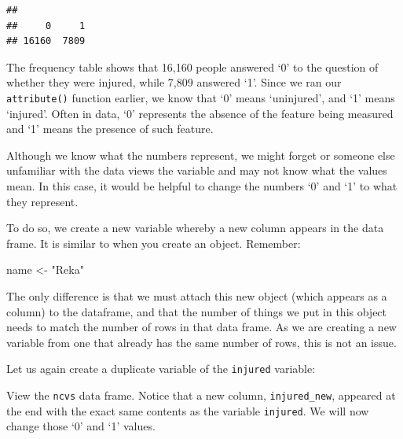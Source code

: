 \documentclass[
]{book}
\newenvironment{Shaded}{\begin{snugshade}}{\end{snugshade}}
\newcommand{\CommentTok}[1]{\textcolor[rgb]{0.56,0.35,0.01}{\textit{#1}}}
\newcommand{\NormalTok}[1]{#1}
\newcommand{\OtherTok}[1]{\textcolor[rgb]{0.56,0.35,0.01}{#1}}
\newcommand{\SpecialCharTok}[1]{\textcolor[rgb]{0.00,0.00,0.00}{#1}}
\newcommand{\StringTok}[1]{\textcolor[rgb]{0.31,0.60,0.02}{#1}}
\begin{document}
\begin{verbatim}
## 
##     0     1 
## 16160  7809
\end{verbatim}

The frequency table shows that 16,160 people answered `0' to the question of whether they were injured, while 7,809 answered `1'. Since we ran our \texttt{attribute()} function earlier, we know that `0' means `uninjured', and `1' means `injured'. Often in data, `0' represents the absence of the feature being measured and `1' means the presence of such feature.

Although we know what the numbers represent, we might forget or someone else unfamiliar with the data views the variable and may not know what the values mean. In this case, it would be helpful to change the numbers `0' and `1' to what they represent.

To do so, we create a new variable whereby a new column appears in the data frame. It is similar to when you create an object. Remember:

\begin{Shaded}
\begin{Highlighting}[]
\NormalTok{name }\OtherTok{\textless{}{-}} \StringTok{"Reka"}
\end{Highlighting}
\end{Shaded}

The only difference is that we must attach this new object (which appears as a column) to the dataframe, and that the number of things we put in this object needs to match the number of rows in that data frame. As we are creating a new variable from one that already has the same number of rows, this is not an issue.

Let us again create a duplicate variable of the \texttt{injured} variable:

\begin{Shaded}
\end{Shaded}

View the \texttt{ncvs} data frame. Notice that a new column, \texttt{injured\_new}, appeared at the end with the exact same contents as the variable \texttt{injured}. We will now change those `0' and `1' values.
\end{document}
